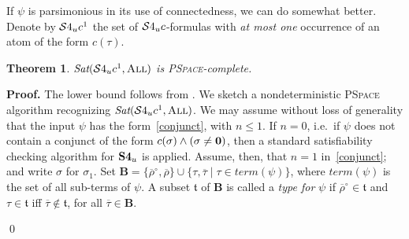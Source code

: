 \documentclass{LMCS}
\renewenvironment{proof}{\par\noindent\textbf{Proof.}}{\mbox{}\qed\par\medskip}
\theoremstyle{plain}
\newtheorem{theorem}[thm]{Theorem}
\newcommand{\ti}[2][]{#2^{\circ_{#1}}}
\newcommand{\compl}[2][]{\overline{#2}}
\newcommand{\Sat}{\textit{Sat}}
\newcommand{\All}{\textsc{All}}
\newcommand{\PSpace}{\textsc{PSpace}}
\newcommand{\tp}{\mathfrak{t}}
\begin{document}
If $\psi$ is parsimonious in its use of connectedness, we can do
somewhat better.  Denote by $\mathcal{S}4_u{}c^1${} the set of $\mathcal{S}4_u{}c${}-formulas
with \emph{at most one} occurrence of an atom of the form $c(\tau)$.


\begin{theorem}\label{thm:one-connected}
$\Sat(\conT^1,\All)$ is \PSpace{}-complete.
\end{theorem}
\begin{proof}
The lower bound follows from \cite{Ladner77}. We sketch a nondeterministic \PSpace{} algorithm
recognizing $\Sat(\conT^1,\All)$.
We may assume
without loss of generality that the input $\psi$ has the
form~\eqref{conjunct}, with $n \leq 1$.  If $n = 0$, i.e.~if $\psi$
does not contain a conjunct of the form $c(\sigma) \land (\sigma \ne
\mathbf{0})$, then a standard satisfiability checking algorithm for ${\bf S4}_u$
is applied. Assume, then, that $n= 1$ in~\eqref{conjunct}; and write
$\sigma$ for $\sigma_1$. Set
$\mathbf{B} = \{\ti{\compl{\rho}},\compl{\rho}\} \cup \{\tau, \compl{\tau}
\mid \tau\in\textit{term}(\psi)\}$, where $\textit{term}(\psi)$
is the set of all sub-terms of $\psi$. A subset $\tp$ of
$\mathbf{B}$ is called a \emph{type for} $\psi$ if
$\ti{\compl{\rho}} \in \tp$ and $\tau\in\tp$ iff
$\compl{\tau}\notin\tp$, for all $\compl{\tau}\in\mathbf{B}$.


\end{proof}
\end{document}
